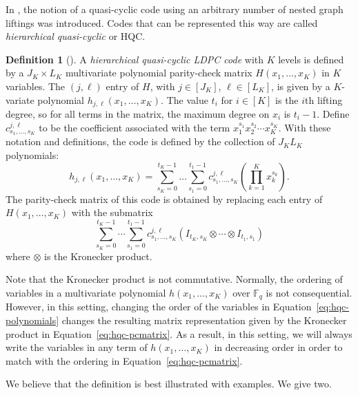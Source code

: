 \documentclass[11pt]{amsart}
\theoremstyle{definition}
\newtheorem{definition}[theorem]{Definition}
\newcommand{\0}{\mathbf{0}}
\newcommand{\F}{\mathbb{F}}
\begin{document}
In \cite{wang2013hierarchical}, the notion of a quasi-cyclic code using an arbitrary number of nested graph liftings was introduced. Codes that can be represented this way are called \textit{hierarchical quasi-cyclic} or HQC.

\begin{definition}[\cite{wang2013hierarchical}] \label{def:hqc}
    A \textit{hierarchical quasi-cyclic LDPC code} with $K$ levels is defined by a $J_K \times L_K$ multivariate polynomial parity-check matrix $H(x_1, \dotsc, x_K)$ in $K$ variables. The $(j,\ell)$ entry of $H$, with $j \in [J_K]$, $\ell \in [L_K]$, is given by a $K$-variate polynomial $h_{j,\ell}(x_1, \dotsc, x_K)$. The value $t_i$ for $i \in [K]$ is the $i$th lifting degree, so for all terms in the matrix, the maximum degree on $x_i$ is $t_i-1$. Define $c_{s_1,\dotsc, s_K}^{j,\ell}$ to be the coefficient associated with the term $x_1^{s_1} x_2^{s_2} \dotsm x_K^{s_K}$. With these notation and definitions, the code is defined by the collection of $J_K L_K$ polynomials:
    \begin{equation} \label{eq:hqc-polynomials}
        h_{j,\ell}(x_1, \dotsc, x_K) = \sum_{s_K=0}^{t_K-1} \dots \sum_{s_1=0}^{t_1-1} c_{s_1, \dotsc, s_K}^{j,\ell} \left( \prod_{k=1}^K x_k^{s_k} \right).
    \end{equation}
    The parity-check matrix of this code is obtained by replacing each entry of $H(x_1, \dotsc, x_K)$ with the submatrix 
    \begin{equation} \label{eq:hqc-pcmatrix}
        \sum_{s_K=0}^{t_K-1} \dotsm \sum_{s_1=0}^{t_1-1} c_{s_1, \dotsc, s_K}^{j,\ell} \left( I_{t_K,s_K} \otimes \dotsm \otimes I_{t_1,s_1} \right)
    \end{equation}
    where $\otimes$ is the Kronecker product.
\end{definition}

Note that the Kronecker product is not commutative. Normally, the ordering of variables in a multivariate polynomial $h(x_1, \dotsc, x_K)$ over $\F_q$ is not consequential. However, in this setting, changing the order of the variables in Equation~\ref{eq:hqc-polynomials} changes the resulting matrix representation given by the Kronecker product in Equation~\ref{eq:hqc-pcmatrix}. As a result, in this setting, we will always write the variables in any term of $h(x_1, \dotsc, x_K)$ in decreasing order in order to match with the ordering in Equation~\ref{eq:hqc-pcmatrix}.

We believe that the definition is best illustrated with examples. We give two.
\end{document}
